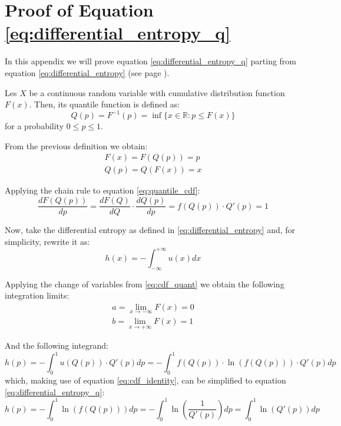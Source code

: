 \chapter{Proof of Equation \ref{eq:differential_entropy_q}}\label{entropy_proof}

In this appendix we will prove equation \ref{eq:differential_entropy_q} parting from equation \ref{eq:differential_entropy} (see page \pageref{eq:differential_entropy}).

Les $X$ be a continuous random variable with cumulative distribution function $F(x)$. Then, its quantile function is defined as:
\begin{equation}
Q(p) = F^{-1}(p) = \inf\{x \in \mathbb{R} : p \leq F(x)\}
\end{equation}
for a probability $0 \leq p \leq 1$.

From the previous definition we obtain:
\begin{align} 
F(x) = F(Q(p)) = p \label{eq:quantile_cdf} \\ 
Q(p) = Q(F(x)) = x \label{eq:cdf_quant}
\end{align}

Applying the chain rule to equation \ref{eq:quantile_cdf}:
\begin{equation}\label{eq:cdf_identity}
\frac{dF(Q(p))}{dp} = \frac{dF(Q)}{dQ} \cdot \frac{dQ(p)}{dp} = f(Q(p)) \cdot Q'(p) = 1
\end{equation}

Now, take the differential entropy as defined in \ref{eq:differential_entropy} and, for simplicity, rewrite it as:
\begin{equation}
h(x) = - \int_{-\infty}^{+\infty} u(x) dx
\end{equation}

Applying the change of variables from \ref{eq:cdf_quant} we obtain the following integration limits:
\begin{align}
a = \lim_{x \to -\infty} F(x) = 0\\
b = \lim_{x \to +\infty} F(x) = 1
\end{align}

And the following integrand:
\begin{equation}
h(p) = - \int_{0}^{1} u(Q(p)) \cdot Q'(p) dp = - \int_{0}^{1} f(Q(p)) \cdot \ln(f(Q(p))) \cdot Q'(p) dp
\end{equation}
which, making use of equation \ref{eq:cdf_identity}, can be simplified to equation \ref{eq:differential_entropy_q}:
\begin{equation}
h(p) = -  \int_{0}^{1} \ln\left(f(Q(p))\right) dp = - \int_{0}^{1} \ln\left(\frac{1}{Q'(p)}\right) dp = \int_{0}^{1} \ln\left(Q'(p)\right) dp
\end{equation}